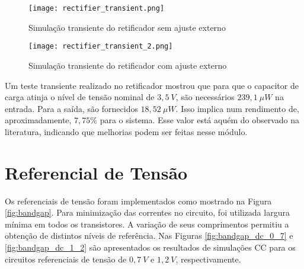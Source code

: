 \begin{figure}[!htb]
	\caption{\label{fig:rectifier_transient}Simulação transiente do retificador sem ajuste externo}
	\begin{center}
		\texttt{[image: rectifier\_transient.png]}
	\end{center}
\end{figure}

\begin{figure}[!htb]
	\caption{\label{fig:rectifier_transient_2}Simulação transiente do retificador com ajuste externo}
	\begin{center}
		\texttt{[image: rectifier\_transient\_2.png]}
	\end{center}
\end{figure}

Um teste transiente realizado no retificador mostrou que para que o capacitor de carga atinja o nível de tensão nominal de $3,5~V$, são necessários $239,1~\mu W$ na entrada. Para a saída, são fornecidos $18,52~\mu W$. Isso implica num rendimento de, aproximadamente, $7,75\%$ para o sistema. Esse valor está aquém do observado na literatura, indicando que melhorias podem ser feitas nesse módulo.





\section{Referencial de Tensão}
Os referenciais de tensão foram implementados como mostrado na Figura \ref{fig:bandgap}. Para minimização das correntes no circuito, foi utilizada largura mínima em todos os transistores. A variação de seus comprimentos permitiu a obtenção de distintos níveis de referência. Nas Figuras \ref{fig:bandgap_dc_0_7} e \ref{fig:bandgap_dc_1_2} são apresentados os resultados de simulações {CC} para os circuitos referenciais de tensão de $0,7~V$ e $1,2~V$, respectivamente.

